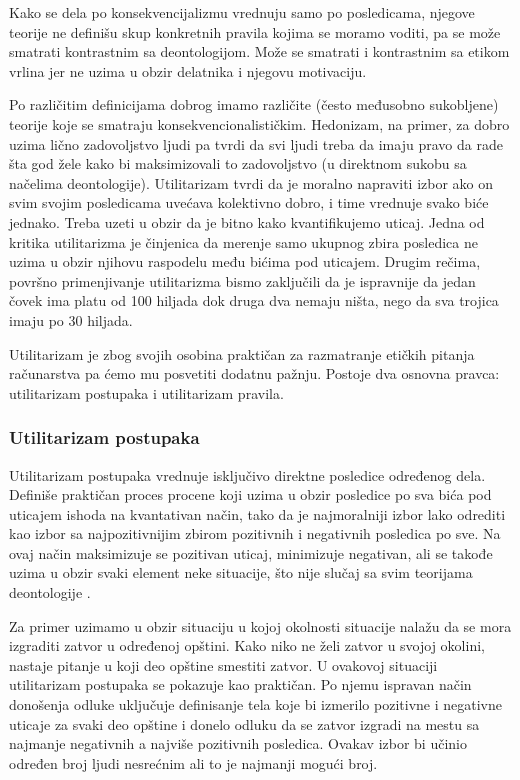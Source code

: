 \documentclass[a4paper]{article}
\begin{document}
Kako se dela po konsekvencijalizmu vrednuju samo po posledicama, njegove teorije ne definišu skup konkretnih pravila kojima se moramo voditi, pa se može smatrati kontrastnim sa deontologijom. Može se smatrati i kontrastnim sa etikom vrlina jer ne uzima u obzir delatnika i njegovu motivaciju. 

Po različitim definicijama dobrog imamo različite (često međusobno sukobljene) teorije koje se smatraju konsekvencionalističkim. Hedonizam, na primer, za dobro uzima lično zadovoljstvo ljudi pa tvrdi da svi ljudi treba da imaju pravo da rade šta god žele kako bi maksimizovali to zadovoljstvo \cite{hedonism-iep} (u direktnom sukobu sa načelima deontologije). Utilitarizam tvrdi da je moralno napraviti izbor ako on svim svojim posledicama uvećava kolektivno dobro, i time vrednuje svako biće jednako. Treba uzeti u obzir da je bitno kako kvantifikujemo uticaj. Jedna od kritika utilitarizma je činjenica da merenje samo ukupnog zbira posledica ne uzima u obzir njihovu raspodelu među bićima pod uticajem. Drugim rečima, površno primenjivanje utilitarizma bismo zaključili da je ispravnije da jedan čovek ima platu od 100 hiljada dok druga dva nemaju ništa, nego da sva trojica imaju po 30 hiljada. 

Utilitarizam je zbog svojih osobina praktičan za razmatranje etičkih pitanja računarstva pa ćemo mu posvetiti dodatnu pažnju. Postoje dva osnovna pravca: utilitarizam postupaka i utilitarizam pravila. 

\subsubsection{Utilitarizam postupaka}
Utilitarizam postupaka vrednuje isključivo direktne posledice određenog dela. Definiše praktičan proces procene koji uzima u obzir posledice po sva bića pod uticajem ishoda na kvantativan način, tako da je najmoralniji izbor lako odrediti kao izbor sa najpozitivnijim zbirom pozitivnih i negativnih posledica po sve. Na ovaj način maksimizuje se pozitivan uticaj, minimizuje negativan, ali se takođe uzima u obzir svaki element neke situacije, što nije slučaj sa svim teorijama deontologije \cite{quinn-ethics}. 

Za primer uzimamo u obzir situaciju u kojoj okolnosti situacije nalažu da se mora izgraditi zatvor u određenoj opštini. Kako niko ne želi zatvor u svojoj okolini, nastaje pitanje u koji deo opštine smestiti zatvor. U ovakovoj situaciji utilitarizam postupaka se pokazuje kao praktičan. Po njemu ispravan način donošenja odluke uključuje definisanje tela koje bi izmerilo pozitivne i negativne uticaje za svaki deo opštine i donelo odluku da se zatvor izgradi na mestu sa najmanje negativnih a najviše pozitivnih posledica. Ovakav izbor bi učinio određen broj ljudi nesrećnim ali to je najmanji mogući broj. 
\end{document}
